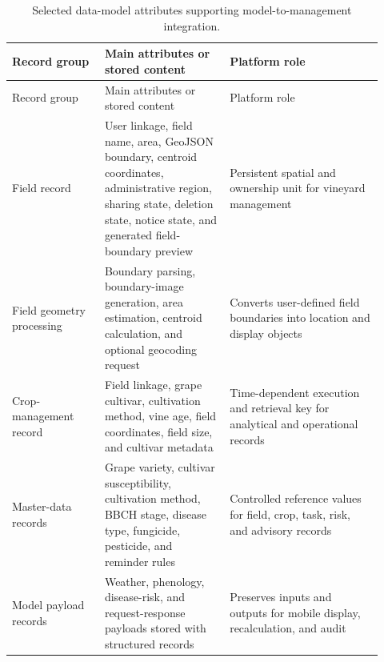 \documentclass[12pt]{article}
\begin{document}
\begingroup
\setlength{\tabcolsep}{3pt}
\renewcommand{\arraystretch}{1.12}
\begin{longtable}{@{}L{0.23\linewidth} L{0.31\linewidth} L{0.38\linewidth}@{}}
\caption{Selected data-model attributes supporting model-to-management integration.}\label{tab:supp_data_model_attributes}\\
\toprule
Record group & Main attributes or stored content & Platform role \\
\midrule
\endfirsthead
\toprule
Record group & Main attributes or stored content & Platform role \\
\midrule
\endhead
Field record & User linkage, field name, area, GeoJSON boundary, centroid coordinates, administrative region, sharing state, deletion state, notice state, and generated field-boundary preview & Persistent spatial and ownership unit for vineyard management \\
Field geometry processing & Boundary parsing, boundary-image generation, area estimation, centroid calculation, and optional geocoding request & Converts user-defined field boundaries into location and display objects \\
Crop-management record & Field linkage, grape cultivar, cultivation method, vine age, field coordinates, field size, and cultivar metadata & Time-dependent execution and retrieval key for analytical and operational records \\
Master-data records & Grape variety, cultivar susceptibility, cultivation method, BBCH stage, disease type, fungicide, pesticide, and reminder rules & Controlled reference values for field, crop, task, risk, and advisory records \\
Model payload records & Weather, phenology, disease-risk, and request-response payloads stored with structured records & Preserves inputs and outputs for mobile display, recalculation, and audit \\
\bottomrule
\end{longtable}
\endgroup
\end{document}
